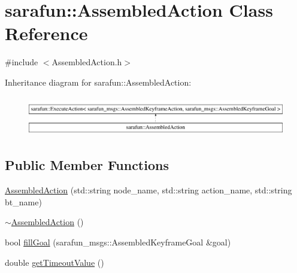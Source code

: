\hypertarget{classsarafun_1_1AssembledAction}{\section{sarafun\-:\-:Assembled\-Action Class Reference}
\label{classsarafun_1_1AssembledAction}
}


{\ttfamily \#include $<$Assembled\-Action.\-h$>$}

Inheritance diagram for sarafun\-:\-:Assembled\-Action\-:\begin{figure}[H]
\begin{center}
\leavevmode
\includegraphics[height=1.741835cm]{classsarafun_1_1AssembledAction}
\end{center}
\end{figure}
\subsection*{Public Member Functions}
\begin{DoxyCompactItemize}
\item 
\hyperlink{classsarafun_1_1AssembledAction_a0207a1b903e0189627087d7ed71bc130}{Assembled\-Action} (std\-::string node\-\_\-name, std\-::string action\-\_\-name, std\-::string bt\-\_\-name)
\item 
\hyperlink{classsarafun_1_1AssembledAction_a8d290f1548b55bca1995df599272fc2f}{$\sim$\-Assembled\-Action} ()
\item 
bool \hyperlink{classsarafun_1_1AssembledAction_a094a5cfde4d6bb6d024256834e771a39}{fill\-Goal} (sarafun\-\_\-msgs\-::\-Assembled\-Keyframe\-Goal \&goal)
\item 
double \hyperlink{classsarafun_1_1AssembledAction_ade9095a291dce652339238d137419b49}{get\-Timeout\-Value} ()
\end{DoxyCompactItemize}


